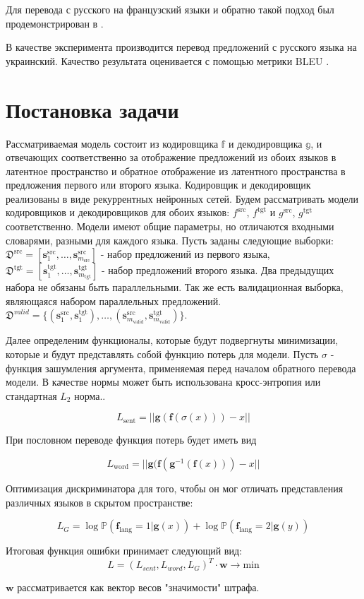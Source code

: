 \documentclass[12pt,twoside]{article}
\begin{document}
Для перевода с русского на французский языки и обратно такой подход был продемонстрирован в \cite{lample2017unsupervised}.

В качестве эксперимента производится перевод предложений с русского языка на украинский. Качество результата оценивается с помощью метрики BLEU \cite{papineni2002bleu}.

\section{Постановка задачи}

Рассматриваемая модель состоит из кодировщика $\mathbb{f}$ и декодировщика $\mathbb{g}$, и отвечающих соответственно за отображение предложений из обоих языков в латентное пространство и обратное отображение из латентного пространства в предложения первого или второго языка. Кодировщик и декодировщик реализованы в виде рекуррентных нейронных сетей. Будем рассматривать модели кодировщиков и декодировщиков для обоих языков: $f^\text{src}$, $f^\text{tgt}$ и $g^\text{src}$, $g^\text{tgt}$ соответственно. Модели имеют общие параметры, но отличаются входными словарями, разными для каждого языка. Пусть заданы следующие выборки: $\mathfrak{D}^{\text{src}} = [\mathbf{s}_1^{\text{src}}, \dots, \mathbf{s}_{m_\text{src}}^{\text{src}}]$ - набор предложений из первого языка, $\mathfrak{D}^{\text{tgt}} = [\mathbf{s}_1^{\text{tgt}}, \dots, \mathbf{s}_{m_\text{tgt}}^{\text{tgt}}]$ - набор предложений второго языка. Два предыдущих набора не обязаны быть параллельными. Так же есть валидационная выборка, являющаяся набором параллельных предложений. $\mathfrak{D}^{valid} = \{(\mathbf{s}_1^{\text{src}}, \mathbf{s}_1^{\text{tgt}}), \dots, (\mathbf{s}_{m_\text{valid}}^{\text{src}}, \mathbf{s}_{m_\text{valid}}^{\text{tgt}})\}$.

Далее определеним функционалы, которые будут подвергнуты минимизации, которые и будут представлять собой функцию потерь для модели.  Пусть $\sigma$ - функция зашумления аргумента, применяемая перед началом обратного перевода модели. В качестве нормы может быть использована кросс-энтропия или стандартная $L_2$ норма..

$$L_{\text{sent}} = ||\mathbf{g}(\mathbf{f}(\sigma(x)))-x||$$

При пословном переводе функция потерь будет иметь вид

$$L_{\text{word}} = ||\mathbf{g}(\mathbf{f}(\mathbf{g}^{-1}(\mathbf{f}(x))) - x||$$

Оптимизация дискриминатора для того, чтобы он мог отличать представления различных языков в скрытом пространстве: 

$$L_{G} = \log \mathbb{P}(\mathbf{f}_{\text{lang}} = 1| \mathbf{g}(x)) + \log \mathbb{P}(\mathbf{f}_{\text{lang}} = 2|\mathbf{g}(y))$$

Итоговая функция ошибки принимает следующий вид:
$$L = (L_{sent}, L_{word}, L_{G})^T \cdot \mathbf{w} \to \text{min}$$

$\mathbf{w}$ рассматривается как вектор весов "значимости" штрафа.






\end{document}
